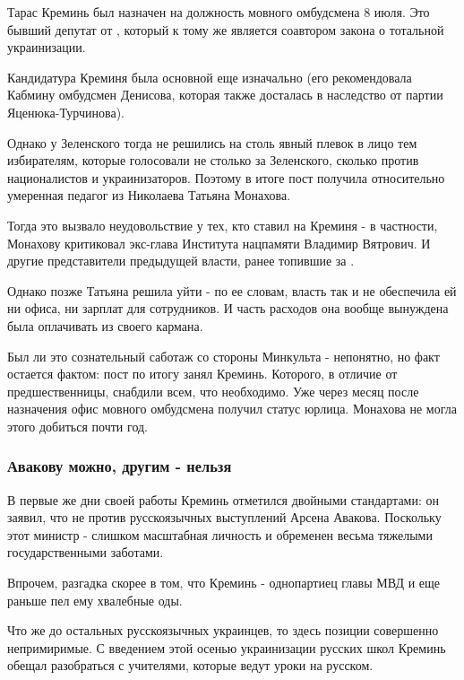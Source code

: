 Тарас Креминь был назначен на должность мовного омбудсмена 8 июля. Это бывший
депутат от , который к тому же является соавтором закона о
тотальной украинизации.

Кандидатура Креминя была основной еще изначально (его рекомендовала Кабмину
омбудсмен Денисова, которая также досталась в наследство от партии
Яценюка-Турчинова).

Однако у Зеленского тогда не решились на столь явный плевок в лицо тем
избирателям, которые голосовали не столько за Зеленского, сколько против
националистов и украинизаторов. Поэтому в итоге пост  получила
относительно умеренная педагог из Николаева Татьяна Монахова. 

Тогда это вызвало неудовольствие у тех, кто ставил на Креминя - в частности,
Монахову критиковал экс-глава Института нацпамяти Владимир Вятрович. И другие
представители предыдущей власти, ранее топившие за . 

Однако позже Татьяна решила уйти - по ее словам, власть так и не обеспечила ей
ни офиса, ни зарплат для сотрудников. И часть расходов она вообще вынуждена
была оплачивать из своего кармана. 

Был ли это сознательный саботаж со стороны Минкульта - непонятно, но факт
остается фактом: пост по итогу занял Креминь. Которого, в отличие от
предшественницы, снабдили всем, что необходимо. Уже через месяц после
назначения офис мовного омбудсмена получил статус юрлица. Монахова не могла
этого добиться почти год. 

\subsubsection{Авакову можно, другим - нельзя}

В первые же дни своей работы Креминь отметился двойными стандартами: он заявил,
что не против русскоязычных выступлений Арсена Авакова. Поскольку этот министр
- слишком масштабная личность и обременен весьма тяжелыми государственными
заботами. 

Впрочем, разгадка скорее в том, что Креминь - однопартиец главы МВД и еще
раньше пел ему хвалебные оды. 

Что же до остальных русскоязычных украинцев, то здесь позиции 
совершенно непримиримые. С введением этой осенью украинизации русских школ
Креминь обещал разобраться с учителями, которые ведут уроки на русском.

